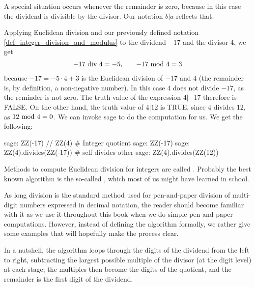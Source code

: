 A special situation occurs whenever the remainder is zero, because in this case the dividend is divisible by the divisor. Our notation $b | a$ reflects that. 


\begin{example} Applying Euclidean division and our previously defined notation \ref{def_integer_division_and_modulus} to the dividend $-17$ and the divisor $4$, we get 
\begin{equation*}
\begin{array}{lcr}
-17 \text{ div } 4 = - 5, & & -17 \text{ mod } 4 = 3
\end{array}
\end{equation*}
because $ -17 = -5 \cdot 4 + 3 $  is the Euclidean division of $-17$ and $4$ (the remainder is, by definition, a non-negative number). In this case $4$ does not divide $-17$, as the reminder is not zero. The truth value of the expression $4 | -17 $ therefore is FALSE. On the other hand, the truth value of $4 | 12$ is TRUE, since $4$ divides $12$, as $ 12 \text{ mod } 4 = 0 $. We can invoke sage to do the computation for us. We get the following:
\begin{sagecommandline}
sage: ZZ(-17) // ZZ(4) # Integer quotient 
sage: ZZ(-17) %
sage: ZZ(4).divides(ZZ(-17)) # self divides other
sage: ZZ(4).divides(ZZ(12))
\end{sagecommandline}
\end{example}

Methods to compute Euclidean division for integers are called . Probably the best known algorithm is the so-called , which most of us might have learned in school.

As long division is the standard method used for pen-and-paper division of multi-digit numbers expressed in decimal notation, the reader should become familiar with it as we use it throughout this book when we do simple pen-and-paper computations. However, instead of defining the algorithm formally, we rather give some examples that will hopefully  make the process clear.

In a nutshell, the algorithm loops through the digits of the dividend from the left to right, subtracting the largest possible multiple of the divisor (at the digit level) at each stage; the multiples then become the digits of the quotient, and the remainder is the first digit of the dividend. 

